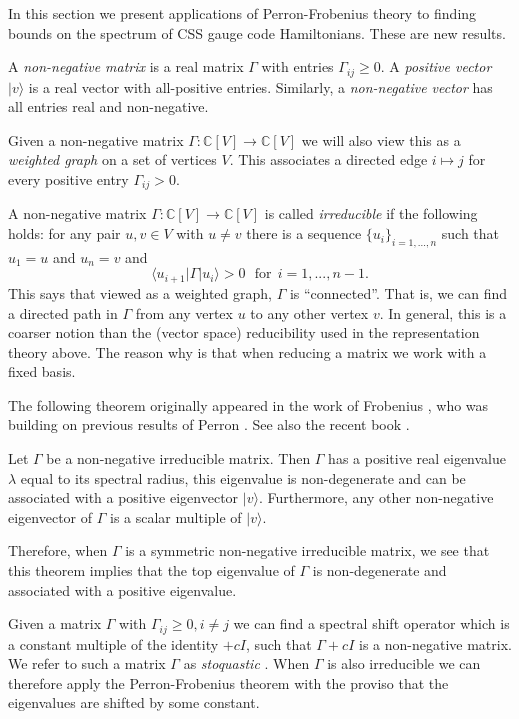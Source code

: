 \documentclass[a4paper,onecolumn,11pt,unpublished]{quantumarticle}
\def\Complex{\mathbb{C}}
\newcommand{\ket}[1]{|{#1}\rangle}
\newcommand{\bra}[1]{\langle{#1}|}
\newcommand\dotheorem[1]{\vskip 5pt \noindent {\bf \underline{Theorem #1.}\ }}
\newcommand\tombstone{\qedsymbol\vskip 5pt}
\newcounter{numitem}
\newcommand{\numitem}[1]{\refstepcounter{numitem}\thenumitem\label{#1}}
\begin{document}
In this section we present 
applications of Perron-Frobenius theory to finding bounds on the spectrum of
CSS gauge code Hamiltonians. These are new results.

A \emph{non-negative matrix} is a real matrix
$\Gamma$ with entries $\Gamma_{ij}\ge 0.$
A \emph{positive vector} $\ket{v}$ is a real vector 
with all-positive entries. Similarly, a \emph{non-negative vector}
has all entries real and non-negative.

Given a non-negative matrix 
$\Gamma : \Complex[V] \to \Complex[V]$
we will also view this as a \emph{weighted graph} on a set of vertices $V.$
This associates a directed edge $i\mapsto j$ for every positive
entry $\Gamma_{ij}>0.$

A non-negative matrix 
$\Gamma : \Complex[V] \to \Complex[V]$
is called \emph{irreducible} if the following holds:
for any pair $u, v\in V$ with $u\ne v$ there is
a sequence $\{u_i \}_{i=1,...,n}$ such that $u_1=u$
and $u_n=v$ and
$$
    \bra{u_{i+1}}\Gamma\ket{u_i} > 0\ \ \ \mbox{for}\ \ i=1,...,n-1.
$$
This says that viewed as a weighted graph, $\Gamma$ is ``connected''.
That is, we can find a directed path in $\Gamma$
from any vertex $u$ to any other vertex $v$.
In general, this is a coarser notion than
the (vector space) reducibility used in the representation theory above.
The reason why is that when reducing a matrix we work
with a fixed basis.

The following theorem originally appeared
in the work of Frobenius \cite{Frobenius1912}, who
was building on previous results of Perron \cite{Perron1907}.
See also the recent book \cite{Baez2018}.

\dotheorem{\numitem{thmPF}}{\it (Perron-Frobenius)}
Let $\Gamma$ be a non-negative irreducible matrix.
Then $\Gamma$ has a positive real eigenvalue
$\lambda$ equal to its spectral radius,
this eigenvalue is non-degenerate and can be associated 
with a positive eigenvector $\ket{v}$.
Furthermore, any other non-negative eigenvector of 
$\Gamma$ is a scalar multiple of $\ket{v}.$
\tombstone

Therefore, when $\Gamma$ is a symmetric non-negative irreducible matrix,
we see that this theorem implies that the top eigenvalue of $\Gamma$ is
non-degenerate and associated with a positive eigenvalue.

Given a matrix $\Gamma$ with $\Gamma_{ij}\ge 0, i\ne j$ we can
find a spectral shift operator which is a constant multiple of the identity $+cI$,
such that $\Gamma+cI$ is a non-negative matrix. 
We refer to such a matrix $\Gamma$ as \emph{stoquastic} \cite{Bravyi2008,Bravyi2015}.
When $\Gamma$ is also irreducible we can therefore apply the Perron-Frobenius
theorem with the proviso that the eigenvalues are shifted by some constant.
\end{document}
